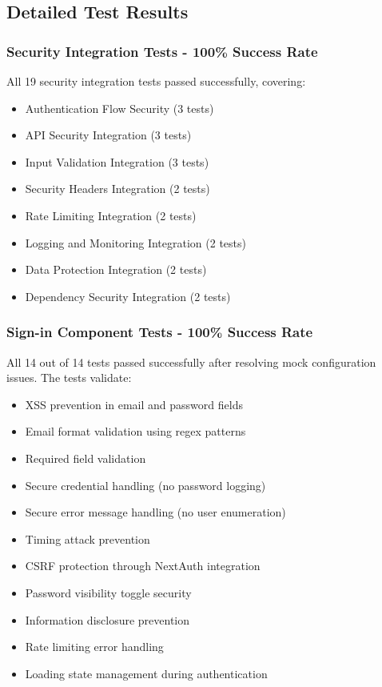\documentclass[12pt]{article}
\begin{document}
\subsection{Detailed Test Results}

\subsubsection{Security Integration Tests - 100\% Success Rate}
All 19 security integration tests passed successfully, covering:
\begin{itemize}
    \item Authentication Flow Security (3 tests)
    \item API Security Integration (3 tests)
    \item Input Validation Integration (3 tests)
    \item Security Headers Integration (2 tests)
    \item Rate Limiting Integration (2 tests)
    \item Logging and Monitoring Integration (2 tests)
    \item Data Protection Integration (2 tests)
    \item Dependency Security Integration (2 tests)
\end{itemize}

\subsubsection{Sign-in Component Tests - 100\% Success Rate}
All 14 out of 14 tests passed successfully after resolving mock configuration issues. The tests validate:
\begin{itemize}
    \item XSS prevention in email and password fields
    \item Email format validation using regex patterns
    \item Required field validation
    \item Secure credential handling (no password logging)
    \item Secure error message handling (no user enumeration)
    \item Timing attack prevention
    \item CSRF protection through NextAuth integration
    \item Password visibility toggle security
    \item Information disclosure prevention
    \item Rate limiting error handling
    \item Loading state management during authentication
\end{itemize}
\end{document}
